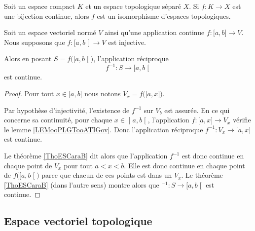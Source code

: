\begin{lemma}       \label{LEMooNEEVooSeHYzx}
	Soit un espace compact \( K\) et un espace topologique séparé \( X\). Si \( f\colon K\to X\) est une bijection continue, alors \( f\) est un isomorphisme d'espaces topologiques.
\end{lemma}

\begin{lemma}        \label{LEMooKSDKooDbKKeB}
	Soit un espace vectoriel normé \( V\) ainsi qu'une application continue \( f\colon \mathopen[ a , b \mathclose]\to V\). Nous supposons que \( f\colon \mathopen[ a , b \mathclose[\to V\) est injective.

	Alors en posant \( S=f\big( \mathopen[ a , b \mathclose[ \big)\), l'application réciproque
	\begin{equation}
		f^{-1}\colon S\to \mathopen[ a , b \mathclose[
	\end{equation}
	est continue.
\end{lemma}

\begin{proof}
	Pour tout \( x\in \mathopen[ a , b \mathclose]\) nous notons \( V_x=f\big( \mathopen[ a , x \mathclose] \big)\).

	Par hypothèse d'injectivité, l'existence de \( f^{-1}\) sur \( V_b\) est assurée. En ce qui concerne sa continuité, pour chaque \( x\in\mathopen] a , b \mathclose[\), l'application \( f\colon \mathopen[ a , x \mathclose]\to V_x\) vérifie le lemme \ref{LEMooPLGTooATIGov}. Donc l'application réciproque \( f^{-1}\colon V_x\to \mathopen[ a , x \mathclose]\) est continue.

	Le théorème \ref{ThoESCaraB} dit alors que l'application \( f^{-1}\) est donc continue en chaque point de \( V_x \) pour tout \( a<x<b\). Elle est donc continue en chaque point de \( f\big( \mathopen[ a , b \mathclose[ \big)\) parce que chacun de ces points est dans un \( V_x\). Le théorème \ref{ThoESCaraB}  (dans l'autre sens) montre alors que \( ^{-1}\colon S\to \mathopen[ a , b \mathclose[\) est continue.
\end{proof}


\subsection{Espace vectoriel topologique}

